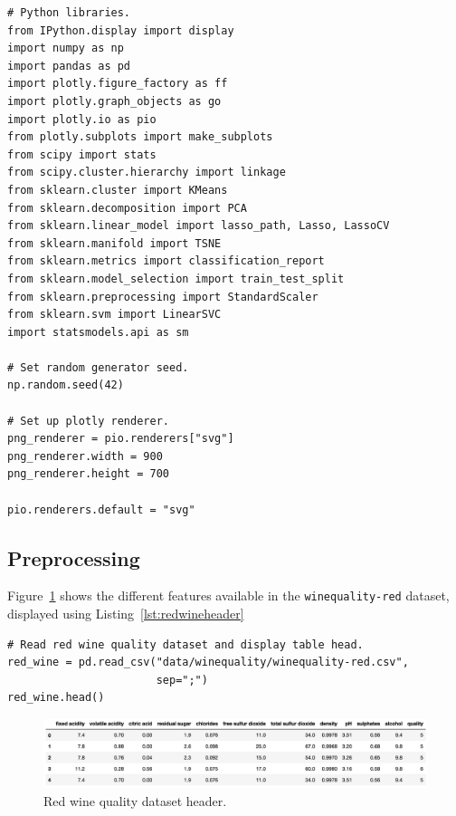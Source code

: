 \documentclass[12pt]{article}
\begin{document}
  \begin{lstlisting}[caption={Python libraries import.}, captionpos=b,
    label={lst:libraries}]
# Python libraries.
from IPython.display import display
import numpy as np
import pandas as pd
import plotly.figure_factory as ff
import plotly.graph_objects as go
import plotly.io as pio
from plotly.subplots import make_subplots
from scipy import stats
from scipy.cluster.hierarchy import linkage
from sklearn.cluster import KMeans
from sklearn.decomposition import PCA
from sklearn.linear_model import lasso_path, Lasso, LassoCV
from sklearn.manifold import TSNE
from sklearn.metrics import classification_report
from sklearn.model_selection import train_test_split 
from sklearn.preprocessing import StandardScaler
from sklearn.svm import LinearSVC
import statsmodels.api as sm

# Set random generator seed.
np.random.seed(42)

# Set up plotly renderer.
png_renderer = pio.renderers["svg"]
png_renderer.width = 900
png_renderer.height = 700

pio.renderers.default = "svg"
  \end{lstlisting}

  \newpage

  \subsection{Preprocessing}

  Figure~\ref{fig:redwineheader} shows the different features available in the
  \lstinline{winequality-red} dataset, displayed using
  Listing~\ref{lst:redwineheader}

  \begin{lstlisting}[caption={Print red wine dataset header.}, captionpos=b,
    label={lst:redwineheader}]
# Read red wine quality dataset and display table head.
red_wine = pd.read_csv("data/winequality/winequality-red.csv", 
                       sep=";")
red_wine.head()
  \end{lstlisting}

  \begin{figure}[!ht]
    \centering
    \includegraphics[width=\textwidth]{figures/redwineheader}
    \caption{Red wine quality dataset header.}%
    \label{fig:redwineheader}
  \end{figure} 
\end{document}
